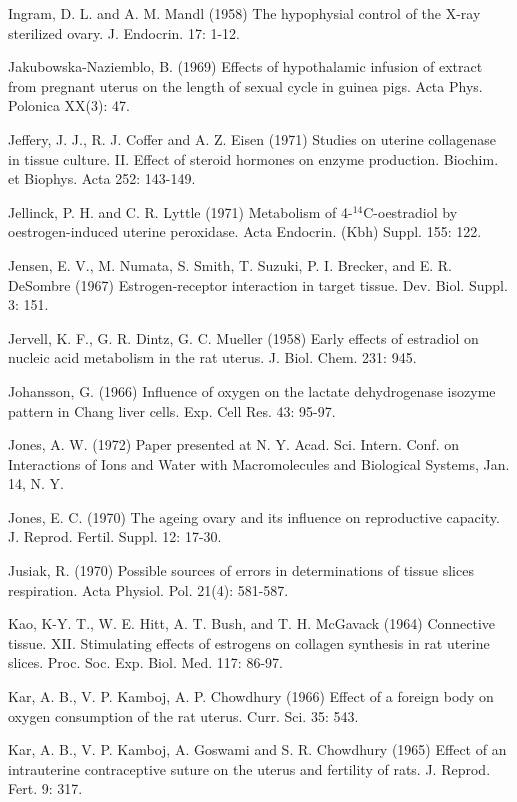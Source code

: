 Ingram, D. L. and A. M. Mandl (1958) The hypophysial control of the X-ray sterilized ovary. J. Endocrin. 17: 1-12.

Jakubowska-Naziemblo, B. (1969) Effects of hypothalamic infusion of extract from pregnant uterus on the length of sexual cycle in guinea pigs. Acta Phys. Polonica XX(3): 47.


Jeffery, J. J., R. J. Coffer and A. Z. Eisen (1971) Studies on uterine collagenase in tissue culture. II. Effect of steroid hormones on enzyme production. Biochim. et Biophys. Acta 252: 143-149.

Jellinck, P. H. and C. R. Lyttle (1971) Metabolism of 4-$^{14}$C-oestradiol by oestrogen-induced uterine peroxidase. Acta Endocrin. (Kbh) Suppl. 155: 122.

Jensen, E. V., M. Numata, S. Smith, T. Suzuki, P. I. Brecker, and E. R. DeSombre (1967) Estrogen-receptor interaction in target tissue. Dev. Biol. Suppl. 3: 151.

Jervell, K. F., G. R. Dintz, G. C. Mueller (1958) Early effects of estradiol on nucleic acid metabolism in the rat uterus. J. Biol. Chem. 231: 945.

Johansson, G. (1966) Influence of oxygen on the lactate dehydrogenase isozyme pattern in Chang liver cells. Exp. Cell Res. 43: 95-97.

Jones, A. W. (1972) Paper presented at N. Y. Acad. Sci. Intern. Conf. on Interactions of Ions and Water with Macromolecules and Biological Systems, Jan. 14, N. Y.

Jones, E. C. (1970) The ageing ovary and its influence on reproductive capacity. J. Reprod. Fertil. Suppl. 12: 17-30.

Jusiak, R. (1970) Possible sources of errors in determinations of tissue slices respiration. Acta Physiol. Pol. 21(4): 581-587.

Kao, K-Y. T., W. E. Hitt, A. T. Bush, and T. H. McGavack (1964) Connective tissue. XII. Stimulating effects of estrogens on collagen synthesis in rat uterine slices. Proc. Soc. Exp. Biol. Med. 117: 86-97.

Kar, A. B., V. P. Kamboj, A. P. Chowdhury (1966) Effect of a foreign body on oxygen consumption of the rat uterus. Curr. Sci. 35: 543.

Kar, A. B., V. P. Kamboj, A. Goswami and S. R. Chowdhury (1965) Effect of an intrauterine contraceptive suture on the uterus and fertility of rats. J. Reprod. Fert. 9: 317.

